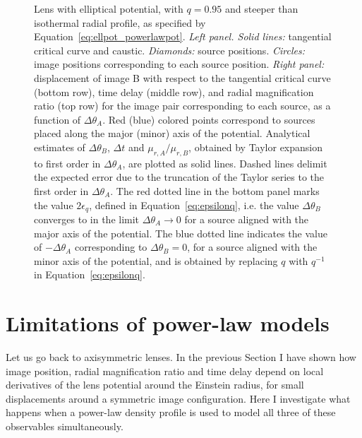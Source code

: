 \documentclass[usenatbib]{mnras}
\def\Eref#1{Equation~\ref{#1}\xspace}
\begin{document}
{\begin{figure}
\begin{tabular}{cc}
 \end{tabular}
 \caption{Lens with elliptical potential, with $q=0.95$ and steeper than isothermal radial profile, as specified by \Eref{eq:ellpot_powerlawpot}. {\em Left panel. Solid lines:} tangential critical curve and caustic. {\em Diamonds:} source positions. {\em Circles:} image positions corresponding to each source position.
{\em Right panel:} displacement of image B with respect to the tangential critical curve (bottom row), time delay (middle row), and radial magnification ratio (top row) for the image pair corresponding to each source, as a function of $\Delta\theta_A$.
Red (blue) colored points correspond to sources placed along the major (minor) axis of the potential. 
Analytical estimates of $\Delta\theta_B$, $\Delta t$ and $\mu_{r,A}/\mu_{r,B}$, obtained by Taylor expansion to first order in $\Delta\theta_A$, are plotted as solid lines. Dashed lines delimit the expected error due to the truncation of the Taylor series to the first order in $\Delta\theta_A$.
The red dotted line in the bottom panel marks the value $2\epsilon_q$, defined in \Eref{eq:epsilonq}, i.e. the value $\Delta\theta_B$ converges to in the limit $\Delta\theta_A\rightarrow0$ for a source aligned with the major axis of the potential. The blue dotted line indicates the value of $-\Delta\theta_A$ corresponding to $\Delta\theta_B=0$, for a source aligned with the minor axis of the potential, and is obtained by replacing $q$ with $q^{-1}$ in \Eref{eq:epsilonq}.
}
 \label{fig:ellpot}
\end{figure}
%
}

\section{Limitations of power-law models}\label{sect:pl}

Let us go back to axisymmetric lenses.
In the previous Section I have shown how image position, radial magnification ratio and time delay depend on local derivatives of the lens potential around the Einstein radius, for small displacements around a symmetric image configuration.
Here I investigate what happens when a power-law density profile is used to model all three of these observables simultaneously.
\end{document}
